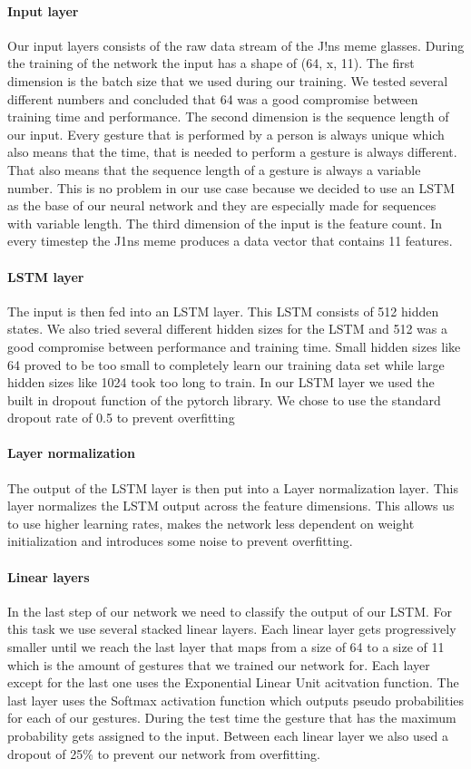 \documentclass[runningheads]{llncs}
\begin{document}
\paragraph{Input layer}
Our input layers consists of the raw data stream of the J!ns meme glasses. During the training of the network the input has a shape of (64, x, 11). The first dimension is the batch size that we used during our training. We tested several different numbers and concluded that 64 was a good compromise between training time and performance. The second dimension is the sequence length of our input. Every gesture that is performed by a person is always unique which also means that the time, that is needed to perform a gesture is always different. That also means that the sequence length of a gesture is always a variable number. This is no problem in our use case because we decided to use an LSTM as the base of our neural network and they are especially made for sequences with variable length. The third dimension of the input is the feature count. In every timestep the J1ns meme produces a data vector that contains 11 features.
\paragraph{LSTM layer}
The input is then fed into an LSTM layer. This LSTM consists of 512 hidden states. We also tried several different hidden sizes for the LSTM and 512 was a good compromise between performance and training time. Small hidden sizes like 64 proved to be too small to completely learn our training data set while large hidden sizes like 1024 took too long to train. In our LSTM layer we used the built in dropout function of the pytorch library. We chose to use the standard dropout rate of 0.5 to prevent overfitting
\paragraph{Layer normalization}
The output of the LSTM layer is then put into a Layer normalization layer. This layer normalizes the LSTM output across the feature dimensions. This allows us to use higher learning rates, makes the network less dependent on weight initialization and introduces some noise to prevent overfitting.
\paragraph{Linear layers}
In the last step of our network we need to classify the output of our LSTM. For this task we use several stacked linear layers. Each linear layer gets progressively smaller until we reach the last layer that maps from a size of 64 to a size of 11 which is the amount of gestures that we trained our network for. Each layer except for the last one uses the Exponential Linear Unit acitvation function. The last layer uses the Softmax activation function which outputs pseudo probabilities for each of our gestures. During the test time the gesture that has the maximum probability gets assigned to the input. Between each linear layer we also used a dropout of 25\% to prevent our network from overfitting.
\end{document}
